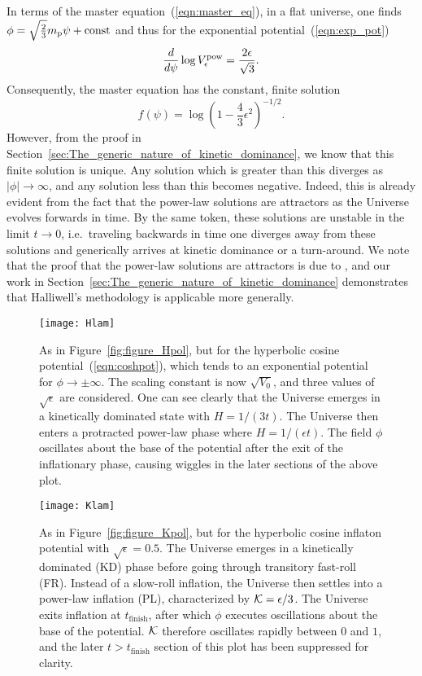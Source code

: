 In terms of the master equation~(\ref{eqn:master_eq}), in a flat universe, one finds $\phi = \sqrt{\frac{2}{3}}m_{\mathrm{p}} \psi + \mathrm{const} $ and thus for the exponential potential~(\ref{eqn:exp_pot}) 
%
\begin{equation}
  \frac{d}{d\psi} \log V^\mathrm{pow}_\epsilon = \frac{2\epsilon}{\sqrt{3}}. 
\end{equation}
%
Consequently, the master equation has the constant, finite solution
%
\begin{equation}
  f(\psi) = \log\left(1-\frac{4}{3}\epsilon^2\right)^{-1/2}.
  \label{eqn:uf_power_law}
\end{equation}
%
However, from the proof in Section~\ref{sec:The_generic_nature_of_kinetic_dominance}, we know that this finite solution is unique. Any solution which is greater than this diverges as $|\phi|\to\infty$, and any solution less than this becomes negative.  Indeed, this is already evident from the fact that the power-law solutions are attractors as the Universe evolves forwards in time. By the same token, these solutions are unstable in the limit $t \to 0$, i.e.\ traveling backwards in time one diverges away from these solutions and generically arrives at kinetic dominance or a turn-around.  We note that the proof that the power-law solutions are attractors is due to \citet{halliwell_scalar_1987}, and our work in Section~\ref{sec:The_generic_nature_of_kinetic_dominance} demonstrates that Halliwell's methodology is applicable more generally.

%
\begin{figure}
  \texttt{[image: Hlam]}
  \caption{As in Figure~\protect\ref{fig:figure_Hpol}, but for the hyperbolic cosine potential~\protect(\ref{eqn:coshpot}), which tends to an exponential potential for $\phi \to \pm\infty$. The scaling constant is now $\sqrt{V_0}$, and three values of $\sqrt{\epsilon}$ are considered. One can see clearly that the Universe emerges in a kinetically dominated state with $H=1/(3t)$. The Universe then enters a protracted power-law phase where $H = 1/(\epsilon t)$. The field $\phi$ oscillates about the base of the potential after the exit of the inflationary phase, causing wiggles in the later sections of the above plot.  }
  \label{fig:figure_Hlam}
\end{figure}
%

%
\begin{figure}
  \texttt{[image: Klam]}
  \caption{As in Figure~\protect\ref{fig:figure_Kpol}, but for the hyperbolic cosine inflaton potential with $\sqrt{\epsilon}=0.5$. The Universe emerges in a kinetically dominated (KD) phase before going through transitory fast-roll (FR). Instead of a slow-roll inflation, the Universe then settles into a power-law inflation (PL), characterized by $\mathcal{K}=\epsilon/3$. The Universe exits inflation at $t_\mathrm{finish}$, after which $\phi$ executes oscillations about the base of the potential. $\mathcal{K}$ therefore oscillates rapidly between $0$ and $1$, and the later $t>t_\mathrm{finish}$ section of this plot has been suppressed for clarity.  }
  \label{fig:figure_Klam}
\end{figure}
%

